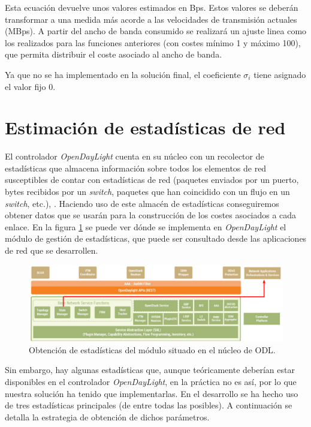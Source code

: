 \documentclass[a4paper,11pt]{book}
\begin{document}
Esta ecuación devuelve unos valores estimados en Bps. Estos valores se deberán transformar a una medida más acorde a las velocidades de transmisión actuales (MBps). A partir del ancho de banda consumido se realizará un ajuste linea como los realizados para las funciones anteriores (con costes mínimo 1 y máximo 100), que permita distribuir el coste asociado al ancho de banda. 

Ya que no se ha implementado en la solución final, el coeficiente $\sigma_i$ tiene asignado el valor fijo 0.


%
%
%
\section{Estimación de estadísticas de red}
\label{sec:parametros-calidad-servicio}

 El controlador \emph{OpenDayLight} cuenta en su núcleo con un recolector de estadísticas que almacena información sobre todos los elementos de red susceptibles de contar con estadísticas de red (paquetes enviados por un puerto, bytes recibidos por un \textit{switch}, paquetes que han coincidido con un flujo en un \textit{switch}, etc.), \cite{developerGuide}. Haciendo uso de este almacén de estadísticas conseguiremos obtener datos que se usarán para la construcción de los costes asociados a cada enlace. En la figura \ref{statisticsODL} se puede ver dónde se implementa en \emph{OpenDayLight} el módulo de gestión de estadísticas, que puede ser consultado desde las aplicaciones de red que se desarrollen.

\begin{figure}[tb]
\centering
\hspace*{-0.3cm}
\includegraphics[scale=0.55]{./figuras/statisticsODL}
\caption[Módulo estadístico núcleo ODL.]{Obtención de estadísticas del módulo situado en el núcleo de ODL.}\label{statisticsODL}
\end{figure}

 Sin embargo, hay algunas estadísticas que, aunque teóricamente deberían estar disponibles en el controlador \emph{OpenDayLight}, en la práctica no es así, por lo que nuestra solución ha tenido que implementarlas.   
En el desarrollo se ha hecho uso de tres estadísticas principales (de entre todas las posibles). A continuación se detalla la estrategia de obtención de dichos parámetros.
\end{document}
